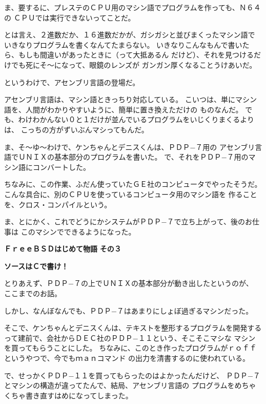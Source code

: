\documentclass[12pt]{jarticle}
\begin{document}
\bigskip

ま、要するに、プレステのＣＰＵ用のマシン語でプログラムを作っても、Ｎ６４の
ＣＰＵでは実行できないってことだ。

\bigskip

とは言え、２進数だか、１６進数だかが、ガシガシと並びまくったマシン語で
いきなりプログラムを書くなんてたまらない。
いきなりこんなもんで書いたら、もしも間違いがあったときに（って大抵あるん
だけど）、それを見つけるだけでも死にそ〜になって、眼鏡のレンズが
ガンガン厚くなることうけあいだ。

というわけで、アセンブリ言語の登場だ。

アセンブリ言語は、マシン語ときっちり対応している。
こいつは、単にマシン語を、人間がわかりやすいように、簡単に置き換えただけの
ものなんだ。
でも、わけわかんない０と１だけが並んでいるプログラムをいじくりまくるよりは、
こっちの方がずいぶんマシってもんだ。


ま、そ〜ゆ〜わけで、ケンちゃんとデニスくんは、ＰＤＰ−７用の
アセンブリ言語でＵＮＩＸの基本部分のプログラムを書いた。
で、それをＰＤＰ−７用のマシン語にコンバートした。

ちなみに、この作業、ふだん使っていたＧＥ社のコンピュータでやったそうだ。
こんな具合に、別のＣＰＵを使っているコンピュータ用のマシン語を
作ることを、クロス・コンパイルという。

ま、とにかく、これでどうにかシステムがＰＤＰ−７で立ち上がって、後のお仕事は
このマシンでできるようになった。
\newpage

\noindent
\textbf{\Huge ＦｒｅｅＢＳＤはじめて物語}
\hspace{1cm}
\textbf{\LARGE その３}

\bigskip

\textbf{\large ソースはＣで書け！}

\bigskip
\bigskip

とりあえず、ＰＤＰ−７の上でＵＮＩＸの基本部分が動き出したというのが、
ここまでのお話。

\bigskip

しかし、なんぼなんでも、ＰＤＰ−７はあまりにしょぼ過ぎるマシンだった。

そこで、ケンちゃんとデニスくんは、テキストを整形するプログラムを開発する
って建前で、会社からＤＥＣ社のＰＤＰ−１１という、そこそこマシな
マシンを買ってもらうことにした。
ちなみに、このとき作ったプログラムがｒｏｆｆというやつで、今でもｍａｎコマンド
の出力を清書するのに使われている。

\bigskip

で、せっかくＰＤＰ−１１を買ってもらったのはよかったんだけど、
ＰＤＰ−７とマシンの構造が違ってたんで、結局、アセンブリ言語の
プログラムをめちゃくちゃ書き直すはめになってしまった。
\end{document}
